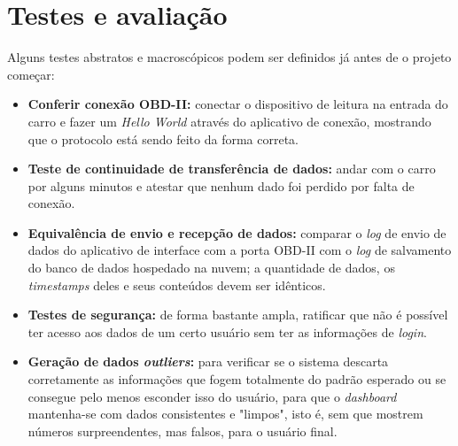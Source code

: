 \section{Testes e avaliação}
Alguns testes abstratos e macroscópicos podem ser definidos já antes de o projeto começar:

\begin{itemize}
    \item \textbf{Conferir conexão OBD-II:} conectar o dispositivo de leitura na entrada do carro e fazer um \textit{Hello World} através do aplicativo de conexão, mostrando que o protocolo está sendo feito da forma correta.
    
    \item \textbf{Teste de continuidade de transferência de dados:} andar com o carro por alguns minutos e atestar que nenhum dado foi perdido por falta de conexão.
    
    \item \textbf{Equivalência de envio e recepção de dados:} comparar o \textit{log} de envio de dados do aplicativo de interface com a porta OBD-II com o \textit{log} de salvamento do banco de dados hospedado na nuvem; a quantidade de dados, os \textit{timestamps} deles e seus conteúdos devem ser idênticos. 
    
    \item \textbf{Testes de segurança:} de forma bastante ampla, ratificar que não é possível ter acesso aos dados de um certo usuário sem ter as informações de \textit{login}.
    
    \item \textbf{Geração de dados \textit{outliers}:} para verificar se o sistema descarta corretamente as informações que fogem totalmente do padrão esperado ou se consegue pelo menos esconder isso do usuário, para que o \textit{dashboard} mantenha-se com dados consistentes e "limpos", isto é, sem que mostrem números surpreendentes, mas falsos, para o usuário final.
    
\end{itemize}


